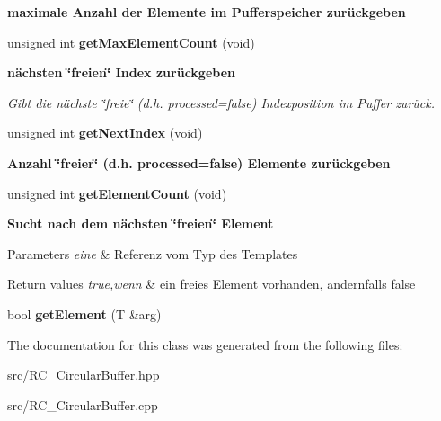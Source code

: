 \begin{Indent}{\bf maximale Anzahl der Elemente im Pufferspeicher zurückgeben}\par
\begin{DoxyCompactItemize}
\item 
\hypertarget{classrc_1_1CircularBuffer_ae4194d665b35b6a86444f54c759878b7}{unsigned int {\bfseries get\+Max\+Element\+Count} (void)}\label{classrc_1_1CircularBuffer_ae4194d665b35b6a86444f54c759878b7}

\end{DoxyCompactItemize}
\end{Indent}
\begin{Indent}{\bf nächsten \char`\"{}freien\char`\"{} Index zurückgeben}\par
{\em Gibt die nächste \char`\"{}freie\char`\"{} (d.\+h. processed=false) Indexposition im Puffer zurück. }\begin{DoxyCompactItemize}
\item 
\hypertarget{classrc_1_1CircularBuffer_a07d170b88c762967442b90ef2a4848fa}{unsigned int {\bfseries get\+Next\+Index} (void)}\label{classrc_1_1CircularBuffer_a07d170b88c762967442b90ef2a4848fa}

\end{DoxyCompactItemize}
\end{Indent}
\begin{Indent}{\bf Anzahl \char`\"{}freier\char`\"{} (d.\+h. processed=false) Elemente zurückgeben}\par
\begin{DoxyCompactItemize}
\item 
\hypertarget{classrc_1_1CircularBuffer_a1bb2a9a349df4e9b8e213434725c8b8f}{unsigned int {\bfseries get\+Element\+Count} (void)}\label{classrc_1_1CircularBuffer_a1bb2a9a349df4e9b8e213434725c8b8f}

\end{DoxyCompactItemize}
\end{Indent}
\begin{Indent}{\bf Sucht nach dem nächsten \char`\"{}freien\char`\"{} Element}\par
{\em 
\begin{DoxyParams}{Parameters}
{\em eine} & Referenz vom Typ des Templates \\
\hline
\end{DoxyParams}

\begin{DoxyRetVals}{Return values}
{\em true,wenn} & ein freies Element vorhanden, andernfalls false \\
\hline
\end{DoxyRetVals}
}\begin{DoxyCompactItemize}
\item 
\hypertarget{classrc_1_1CircularBuffer_a4ef798c56ada44df67cc4bb5ae1a08eb}{bool {\bfseries get\+Element} (T \&arg)}\label{classrc_1_1CircularBuffer_a4ef798c56ada44df67cc4bb5ae1a08eb}

\end{DoxyCompactItemize}
\end{Indent}


The documentation for this class was generated from the following files\+:\begin{DoxyCompactItemize}
\item 
src/\hyperlink{RC__CircularBuffer_8hpp}{R\+C\+\_\+\+Circular\+Buffer.\+hpp}\item 
src/R\+C\+\_\+\+Circular\+Buffer.\+cpp\end{DoxyCompactItemize}
